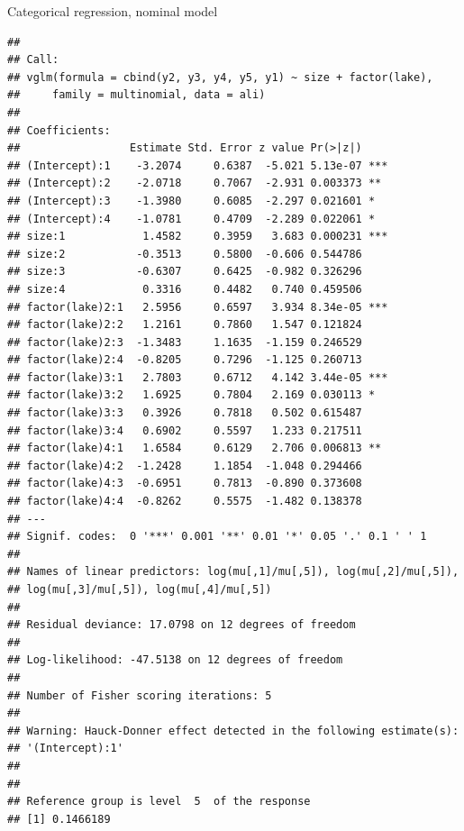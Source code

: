 \documentclass[
  ignorenonframetext,
]{beamer}
\begin{document}
\begin{frame}[fragile]
\begin{block}{Categorical regression, nominal model}
\begin{verbatim}
## 
## Call:
## vglm(formula = cbind(y2, y3, y4, y5, y1) ~ size + factor(lake), 
##     family = multinomial, data = ali)
## 
## Coefficients: 
##                 Estimate Std. Error z value Pr(>|z|)    
## (Intercept):1    -3.2074     0.6387  -5.021 5.13e-07 ***
## (Intercept):2    -2.0718     0.7067  -2.931 0.003373 ** 
## (Intercept):3    -1.3980     0.6085  -2.297 0.021601 *  
## (Intercept):4    -1.0781     0.4709  -2.289 0.022061 *  
## size:1            1.4582     0.3959   3.683 0.000231 ***
## size:2           -0.3513     0.5800  -0.606 0.544786    
## size:3           -0.6307     0.6425  -0.982 0.326296    
## size:4            0.3316     0.4482   0.740 0.459506    
## factor(lake)2:1   2.5956     0.6597   3.934 8.34e-05 ***
## factor(lake)2:2   1.2161     0.7860   1.547 0.121824    
## factor(lake)2:3  -1.3483     1.1635  -1.159 0.246529    
## factor(lake)2:4  -0.8205     0.7296  -1.125 0.260713    
## factor(lake)3:1   2.7803     0.6712   4.142 3.44e-05 ***
## factor(lake)3:2   1.6925     0.7804   2.169 0.030113 *  
## factor(lake)3:3   0.3926     0.7818   0.502 0.615487    
## factor(lake)3:4   0.6902     0.5597   1.233 0.217511    
## factor(lake)4:1   1.6584     0.6129   2.706 0.006813 ** 
## factor(lake)4:2  -1.2428     1.1854  -1.048 0.294466    
## factor(lake)4:3  -0.6951     0.7813  -0.890 0.373608    
## factor(lake)4:4  -0.8262     0.5575  -1.482 0.138378    
## ---
## Signif. codes:  0 '***' 0.001 '**' 0.01 '*' 0.05 '.' 0.1 ' ' 1
## 
## Names of linear predictors: log(mu[,1]/mu[,5]), log(mu[,2]/mu[,5]), 
## log(mu[,3]/mu[,5]), log(mu[,4]/mu[,5])
## 
## Residual deviance: 17.0798 on 12 degrees of freedom
## 
## Log-likelihood: -47.5138 on 12 degrees of freedom
## 
## Number of Fisher scoring iterations: 5 
## 
## Warning: Hauck-Donner effect detected in the following estimate(s):
## '(Intercept):1'
## 
## 
## Reference group is level  5  of the response
## [1] 0.1466189
\end{verbatim}
\end{block}
\end{frame}
\end{document}
